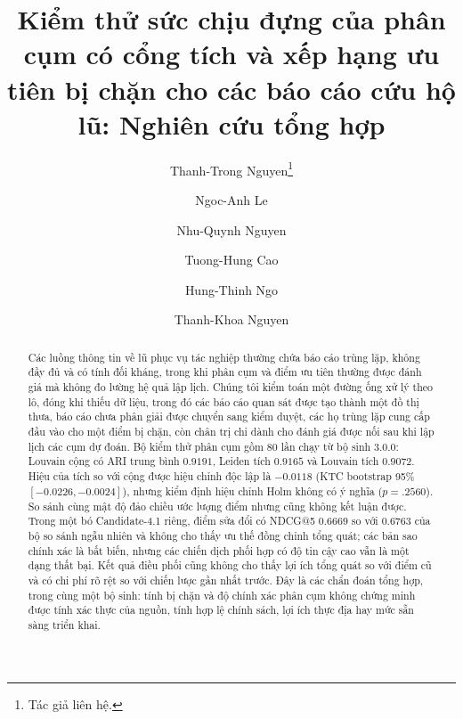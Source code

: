 \documentclass[runningheads]{llncs}
\begin{document}
\title{Kiểm thử sức chịu đựng của phân cụm có cổng tích và xếp hạng ưu tiên
bị chặn cho các báo cáo cứu hộ lũ: Nghiên cứu tổng hợp}

\author{Thanh-Trong Nguyen\thanks{Tác giả liên hệ.} \and
Ngoc-Anh Le \and
Nhu-Quynh Nguyen \and
Tuong-Hung Cao \and
Hung-Thinh Ngo \and
Thanh-Khoa Nguyen}

\maketitle

\begin{abstract}
Các luồng thông tin về lũ phục vụ tác nghiệp thường chứa báo cáo trùng lặp,
không đầy đủ và có tính đối kháng, trong khi phân cụm và điểm ưu tiên thường
được đánh giá mà không đo lường hệ quả lập lịch. Chúng tôi kiểm toán một
đường ống xử lý theo lô, đóng khi thiếu dữ liệu, trong đó các báo cáo quan
sát được tạo thành một đồ thị thưa, báo cáo chưa phân giải được chuyển sang
kiểm duyệt, các họ trùng lặp cung cấp đầu vào cho một điểm bị chặn, còn chân
trị chỉ dành cho đánh giá được nối sau khi lập lịch các cụm dự đoán. Bộ kiểm
thử phân cụm gồm 80 lần chạy từ bộ sinh 3.0.0: Louvain cộng có ARI trung
bình $0.9191$, Leiden tích $0.9165$ và Louvain tích $0.9072$. Hiệu của tích
so với cộng được hiệu chỉnh độc lập là $-0.0118$ (KTC bootstrap 95\%
$[-0.0226,-0.0024]$), nhưng kiểm định hiệu chỉnh Holm không có ý nghĩa
($p=.2560$). So sánh cùng mật độ đảo chiều ước lượng điểm nhưng cũng không
kết luận được. Trong một bó Candidate-4.1 riêng, điểm sửa đổi có NDCG@5
$0.6669$ so với $0.6763$ của bộ so sánh ngẫu nhiên và không cho thấy ưu thế
đồng chỉnh tổng quát; các bản sao chính xác là bất biến, nhưng các chiến dịch
phối hợp có độ tin cậy cao vẫn là một dạng thất bại. Kết quả điều phối cũng
không cho thấy lợi ích tổng quát so với điểm cũ và có chi phí rõ rệt so với
chiến lược gần nhất trước. Đây là các chẩn đoán tổng hợp, trong cùng một bộ
sinh: tính bị chặn và độ chính xác phân cụm không chứng minh được tính xác
thực của nguồn, tính hợp lệ chính sách, lợi ích thực địa hay mức sẵn sàng
triển khai.
\end{abstract}
\end{document}
